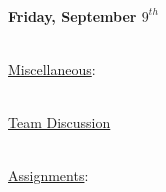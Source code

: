 \documentclass[12pt]{extarticle}
\newenvironment{myindentpar}[1]%
 {\begin{list}{}%
         {\setlength{\leftmargin}{#1}}%
         \item[]%
 }
 {\end{list}}
\begin{document}

\ \\
\textbf{Friday, September $9^{th}$}

\ \\
\underline{Miscellaneous}:

\begin{myindentpar}{6.5mm}

    \noindent

\end{myindentpar}

\ \\
\underline{Team Discussion}

\begin{myindentpar}{6.5mm}

    \noindent

\end{myindentpar}

\ \\
\underline{Assignments}:

\begin{myindentpar}{6.5mm}

    \noindent

\end{myindentpar}
\end{document}
